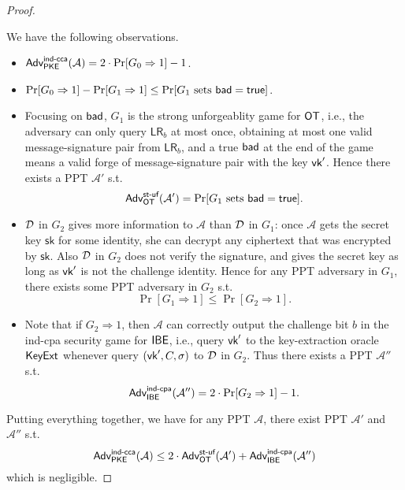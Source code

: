 \documentclass[12pt]{article}
\newcommand{\getsr}{\stackrel{\$}{\gets}}
\newcommand{\Adv}{\textsf{Adv}}
\newcommand{\true}{\textsf{true}}
\theoremstyle{definition}
\newcommand{\PKE}{\textsf{PKE}}
\newcommand{\Kg}{\textsf{Kg}}
\newcommand{\sk}{\textsf{sk}}
\newcommand{\A}{\mathcal{A}}
\newcommand{\LR}{\textsf{LR}}
\begin{document}
\begin{proof}
\begin{itemize}
\end{itemize}
We have the following observations.
\begin{itemize}
\item $\Adv_{\PKE}^{\cca}(\A) = 2\cdot\Pr[G_0 \Rightarrow 1]-1$.
\item $\Pr[G_0 \Rightarrow 1] - \Pr[G_1 \Rightarrow 1] \leq \Pr[\textrm{$G_1$ sets $\bad = \true$}]$.
\item Focusing on $\textsf{bad}$, $G_1$ is the strong unforgeablity game for $\textsf{OT}$, i.e., the adversary can only query $\LR_b$ at most once, obtaining at most one valid message-signature pair from $\LR_b$, and a true $\textsf{bad}$ at the end of the game means a valid forge of message-signature pair with the key $\textsf{vk}'$. Hence there exists a PPT $\A'$ s.t.
	$$\Adv_{\OT}^{\textsf{st-uf}}(\A') = \Pr[\textrm{$G_1$ sets $\bad = \true$}].$$
\item $\mathcal{D}$ in $G_2$ gives more information to $\A$ than $\mathcal{D}$ in $G_1$: once $\A$ gets the secret key $\sk$ for some identity, she can decrypt any ciphertext that was encrypted by $\sk$. Also $\mathcal{D}$ in $G_2$ does not verify the signature, and gives the secret key as long as $\textsf{vk}'$ is not the challenge identity. Hence for any PPT adversary in $G_1$, there exists some PPT adversary in $G_2$ s.t.
$$\Pr[G_1 \Rightarrow 1] \leq \Pr[G_2 \Rightarrow 1].$$
\item Note that if $G_2 \Rightarrow 1$, then $\A$ can correctly output the challenge bit $b$ in the ind-cpa security game for $\textsf{IBE}$, i.e., query $\textsf{vk}'$ to the key-extraction oracle $\textsf{KeyExt}$ whenever query $(\textsf{vk}', C,\sigma)$ to $\mathcal{D}$ in $G_2$. Thus there exists a PPT $\A''$ s.t.
$$\Adv_{\IBE}^{\cpa}(\A'') = 2\cdot\Pr[G_2 \Rightarrow 1] - 1.$$
\end{itemize}
Putting everything together, we have for any PPT $\A$, there exist PPT $\A'$ and $\A''$ s.t.
$$\Adv_{\PKE}^{\cca}(\A) \leq 2\cdot\Adv_{\OT}^{\textsf{st-uf}}(\A') + \Adv_{\IBE}^{\cpa}(\A'')$$
which is negligible.
\end{proof}
\end{document}

